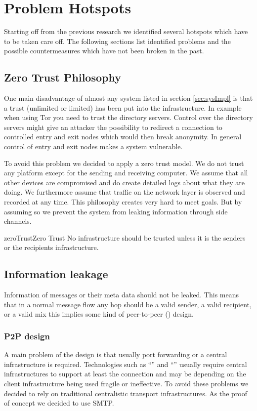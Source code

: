 \section{Problem Hotspots}
Starting off from the previous research we identified several hotspots which have to be taken care off. The following sections list identified problems and the possible countermeasures which have not been broken in the past.


\subsection{Zero Trust Philosophy}
One main disadvantage of almost any system listed in section \ref{sec:sysImpl} is that a trust (unlimited or limited) has been put into the infrastructure. In example when using Tor you need to trust the directory servers. Control over the directory servers might give an attacker the possibility to redirect a connection to controlled entry and exit nodes which would then break anonymity. In general control of entry and exit nodes makes a system vulnerable. 

To avoid this problem we decided to apply a zero trust model. We do not trust any platform except for the sending and receiving computer. We assume that all other devices are compromised and do create detailed logs about what they are doing. We furthermore assume that traffic on the network layer is observed and recorded at any time. This philosophy creates very hard to meet goals. But by assuming so we prevent the system from leaking information through side channels.

\begin{requirement}{zeroTrust}{Zero Trust}
	No infrastructure should be trusted unless it is the senders or the recipients infrastructure.
\end{requirement}	

\subsection{Information leakage}
Information of messages or their meta data should not be leaked. This means that in a normal message flow any hop should be a valid sender, a valid recipient, or a valid mix this implies some kind of peer-to-peer () design. 

\subsubsection{P2P design}
A main problem of the  design is that usually port forwarding or a central infrastructure is required. Technologies such as ``'' and ``'' usually require central infrastructures to support at least the connection and may be depending on the client infrastructure being used fragile or ineffective. To avoid these problems we decided to rely on traditional centralistic transport infrastructures. As the proof of concept we decided to use SMTP. 

